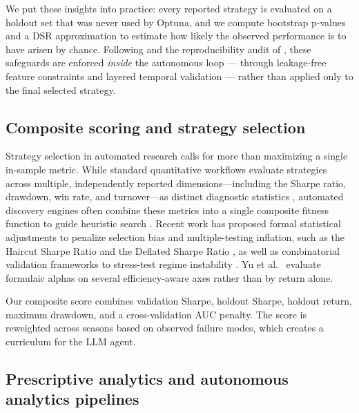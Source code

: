 \documentclass[11pt,a4paper]{article}
\begin{document}
We put these insights into practice: every reported strategy is evaluated on a holdout set that was never used by Optuna, and we compute bootstrap p-values and a DSR approximation to estimate how likely the observed performance is to have arisen by chance. Following \citep{benjamini_hochberg_1995} and the reproducibility audit of \citep{yao_zheng_2026}, these safeguards are enforced \emph{inside} the autonomous loop --- through leakage-free feature constraints and layered temporal validation --- rather than applied only to the final selected strategy.

\subsection{Composite scoring and strategy selection}\label{composite-scoring-and-strategy-selection}

Strategy selection in automated research calls for more than maximizing a single in-sample metric. While standard quantitative workflows evaluate strategies across multiple, independently reported dimensions---including the Sharpe ratio, drawdown, win rate, and turnover---as distinct diagnostic statistics \citep{prado_2018}, automated discovery engines often combine these metrics into a single composite fitness function to guide heuristic search \citep{zhang_2025, allen_1999}. Recent work has proposed formal statistical adjustments to penalize selection bias and multiple-testing inflation, such as the Haircut Sharpe Ratio \citep{harvey_2015} and the Deflated Sharpe Ratio \citep{bailey_2014}, as well as combinatorial validation frameworks to stress-test regime instability \citep{prado_2018, bengio_2009}. Yu et al.~\citep{yu_2023_synergistic_alpha} evaluate formulaic alphas on several efficiency-aware axes rather than by return alone.

Our composite score combines validation Sharpe, holdout Sharpe, holdout return, maximum drawdown, and a cross-validation AUC penalty. The score is reweighted across seasons based on observed failure modes, which creates a curriculum for the LLM agent.

\subsection{Prescriptive analytics and autonomous analytics pipelines}\label{prescriptive-analytics-and-autonomous-analytics-pipelines}
\end{document}
